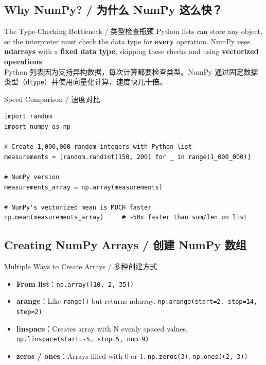 \documentclass[11pt,a4paper]{report}
\let\oldtexttt\texttt
\renewcommand{\texttt}[1]{\textcolor{mainblue}{\oldtexttt{#1}}}
\begin{document}
\subsection{Why NumPy? / 为什么 NumPy 这么快？}

\begin{concept}{The Type-Checking Bottleneck / 类型检查瓶颈}
    Python lists can store any object, so the interpreter must check the data type for \textbf{every} operation. NumPy uses \textbf{ndarrays} with a \textbf{fixed data type}, skipping these checks and using \textbf{vectorized operations}. \\
    Python 列表因为支持异构数据，每次计算都要检查类型。NumPy 通过固定数据类型（\texttt{dtype}）并使用向量化计算，速度快几十倍。
\end{concept}

\begin{examplebox}{Speed Comparison / 速度对比}
\begin{lstlisting}
import random
import numpy as np

# Create 1,000,000 random integers with Python list
measurements = [random.randint(150, 200) for _ in range(1_000_000)]

# NumPy version
measurements_array = np.array(measurements)

# NumPy's vectorized mean is MUCH faster
np.mean(measurements_array)     # ~50x faster than sum/len on list
\end{lstlisting}
\end{examplebox}

\subsection{Creating NumPy Arrays / 创建 NumPy 数组}

\begin{concept}{Multiple Ways to Create Arrays / 多种创建方式}
    \begin{itemize}[itemsep=0.5em]
        \item \textbf{From list}：\texttt{np.array([10, 2, 35])}
        \item \textbf{arange}：Like \texttt{range()} but returns ndarray. \texttt{np.arange(start=2, stop=14, step=2)}
        \item \textbf{linspace}：Creates array with N evenly spaced values. \texttt{np.linspace(start=-5, stop=5, num=9)}
        \item \textbf{zeros / ones}：Arrays filled with 0 or 1. \texttt{np.zeros(3)}, \texttt{np.ones((2, 3))}
    \end{itemize}
\end{concept}
\end{document}
